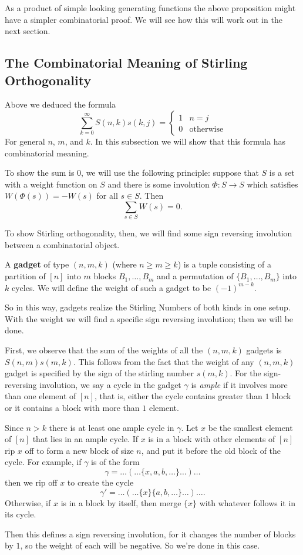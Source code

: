 As a product of simple looking generating functions the above proposition might have a simpler combinatorial proof. We will see how this will work out in the next section.

\subsection{The Combinatorial Meaning of Stirling Orthogonality}

Above we deduced the formula
\[\sum_{k = 0}^{\infty}S(n, k)s(k, j) = \begin{cases}1 & n = j \\ 0 & \text{otherwise}\end{cases}\]
For general $n$, $m$, and $k$. In this subsection we will show that this formula has combinatorial meaning.

To show the sum is $0$, we will use the following principle: suppose that $S$ is a set with a weight function on $S$ and there is some involution $\Phi: S \to S$ which satisfies $W(\Phi(s)) = -W(s)$ for all $s \in S$. Then
\[\sum_{s \in S}W(s) = 0.\]

To show Stirling orthogonality, then, we will find some sign reversing involution between a combinatorial object.

\begin{definition}
A \textbf{gadget} of type $(n, m, k)$ (where $n \geq m \geq k$) is a tuple consisting of a partition of $[n]$ into $m$ blocks $B_1, \dots, B_m$ and a permutation of $\{B_1, \dots, B_m\}$ into $k$ cycles.
We will define the weight of such a gadget to be $(-1)^{m-k}$.
\end{definition}

So in this way, gadgets realize the Stirling Numbers of both kinds in one setup. With the weight we will find a specific sign reversing involution; then we will be done.

First, we observe that the sum of the weights of all the $(n, m, k)$ gadgets is $S(n, m)s(m, k)$. This follows from the fact that the weight of any $(n,m,k)$ gadget is specified by the sign of the stirling number $s(m, k)$. For the sign-reversing involution, we say a cycle in the gadget $\gamma$ is \textit{ample} if it involves more than one element of $[n]$, that is, either the cycle contains greater than $1$ block or it contains a block with more than $1$ element.

Since $n > k$ there is at least one ample cycle in $\gamma$. Let $x$ be the smallest element of $[n]$ that lies in an ample cycle. If $x$ is in a block with other elements of $[n]$ rip $x$ off to form a new block of size $n$, and put it before the old block of the cycle. For example, if $\gamma$ is of the form
\[\gamma = \dots(\dots\{x, a, b, \dots\}\dots)\dots\] then we rip off $x$ to create the cycle
\[\gamma' = \dots(\dots\{x\}\{a, b, \dots\}\dots)\dots.\] Otherwise, if $x$ is in a block by itself, then merge $\{x\}$ with whatever follows it in its cycle.

Then this defines a sign reversing involution, for it changes the number of blocks by $1$, so the weight of each will be negative. So we're done in this case.